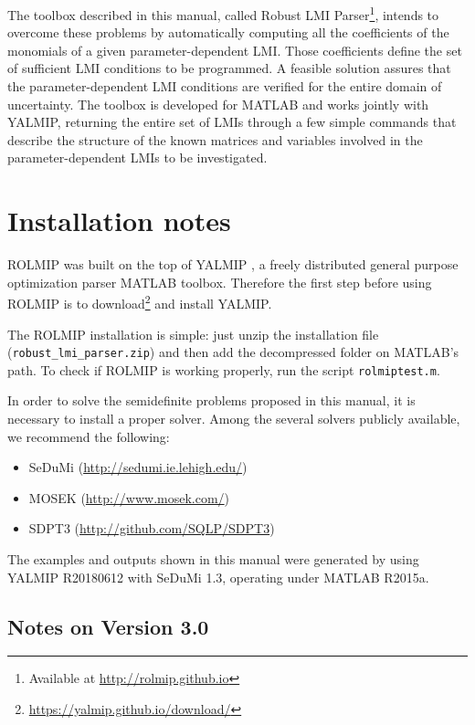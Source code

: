 \documentclass[english,11pt]{article}
\theoremstyle{break} \theorembodyfont{\small\rm}
\begin{document}
The toolbox described in this manual, called Robust LMI Parser\footnote{Available
at \url{http://rolmip.github.io}}, intends to 
overcome these problems by automatically computing all the coefficients of the monomials of a given 
parameter-dependent LMI. Those coefficients define the set of sufficient LMI conditions to be programmed. 
A feasible solution assures that the parameter-dependent LMI conditions are verified for the entire domain of uncertainty.  
The toolbox is developed for MATLAB and works jointly with YALMIP,
returning the entire set of LMIs through a few simple commands that describe the 
structure of the known matrices and variables involved in the parameter-dependent LMIs to be investigated. 

\section{Installation notes}

ROLMIP was built on the top of YALMIP \cite{Lof:04}, a freely distributed general purpose optimization parser MATLAB toolbox.
Therefore the first step before using ROLMIP is to download\footnote{\url{https://yalmip.github.io/download/}} and install YALMIP.

The ROLMIP installation is simple: just unzip the installation file ({\tt robust\_lmi\_parser.zip}) and then add the decompressed folder on MATLAB's path. 
To check if ROLMIP is working properly, run the script {\tt rolmiptest.m}.

In order to solve the semidefinite problems proposed in this manual, it is necessary to install a proper solver. Among the several solvers publicly available,
we recommend the following:
\begin{itemize}
 \item SeDuMi (\url{http://sedumi.ie.lehigh.edu/})
 
 \item MOSEK (\url{http://www.mosek.com/})
 
 \item SDPT3 (\url{http://github.com/SQLP/SDPT3})
\end{itemize}

The examples and outputs shown in this manual were generated by using YALMIP R20180612 with SeDuMi 1.3, operating under
MATLAB R2015a.


\subsection{Notes on Version 3.0}
\end{document}
